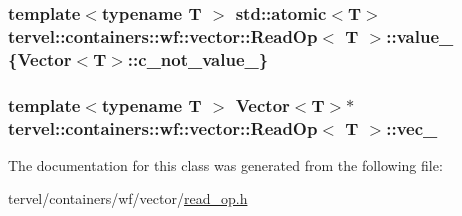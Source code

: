\subsubsection[{value\+\_\+}]{\setlength{\rightskip}{0pt plus 5cm}template$<$typename T $>$ std\+::atomic$<$T$>$ {\bf tervel\+::containers\+::wf\+::vector\+::\+Read\+Op}$<$ T $>$\+::value\+\_\+ \{Vector$<$T$>$\+::c\+\_\+not\+\_\+value\+\_\+\}\hspace{0.3cm}{\ttfamily [private]}}\label{classtervel_1_1containers_1_1wf_1_1vector_1_1_read_op_accb5f2574e02c570e6fc7386e65d2ddf}
\hypertarget{classtervel_1_1containers_1_1wf_1_1vector_1_1_read_op_aa345d1b47f36e47a74b185ea1ab11390}{}
\subsubsection[{vec\+\_\+}]{\setlength{\rightskip}{0pt plus 5cm}template$<$typename T $>$ Vector$<$T$>$$\ast$ {\bf tervel\+::containers\+::wf\+::vector\+::\+Read\+Op}$<$ T $>$\+::vec\+\_\+\hspace{0.3cm}{\ttfamily [private]}}\label{classtervel_1_1containers_1_1wf_1_1vector_1_1_read_op_aa345d1b47f36e47a74b185ea1ab11390}


The documentation for this class was generated from the following file\+:\begin{DoxyCompactItemize}
\item 
tervel/containers/wf/vector/\hyperlink{read__op_8h}{read\+\_\+op.\+h}\end{DoxyCompactItemize}

